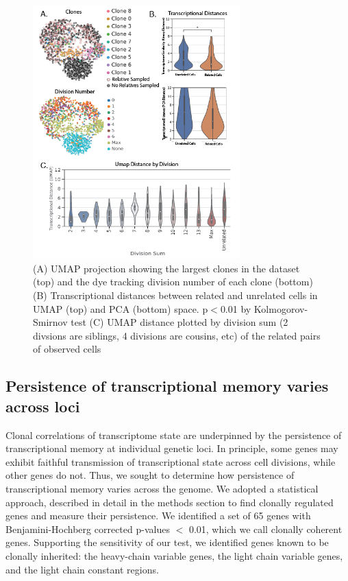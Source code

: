 \begin{figure}[htb!]
\centering
\includegraphics[width=8cm, keepaspectratio]{figs/prelim_InVitro/BCellLineagePaper_Figure 2.png}
\caption[Transcriptomic similarity of clones \textit{in vitro}]{(A) UMAP projection showing the largest clones in the dataset (top) and the dye tracking division number of each clone (bottom) (B) Transcriptional distances between related and unrelated cells in UMAP (top) and PCA (bottom) space. p$<$0.01 by Kolmogorov-Smirnov test (C) UMAP distance plotted by division sum (2 divsions are siblings, 4 divisions are cousins, etc) of the related pairs of observed cells}
\label{fig:paper2_prelimfig_2}
\end{figure}



\subsection{Persistence of transcriptional memory varies across loci}
Clonal correlations of transcriptome state are underpinned by the persistence of transcriptional memory at individual genetic loci. In principle, some genes may exhibit faithful transmission of transcriptional state across cell divisions, while other genes do not. Thus, we sought to determine how persistence of transcriptional memory varies across the genome.
We adopted a statistical approach, described in detail in the methods section to find clonally regulated genes and measure their persistence. We identified a set of 65 genes with Benjamini-Hochberg corrected p-values $<$ 0.01, which we call clonally coherent genes. Supporting the sensitivity of our test, we identified genes known to be clonally inherited: the heavy-chain variable genes, the light chain variable genes, and the light chain constant regions. 

